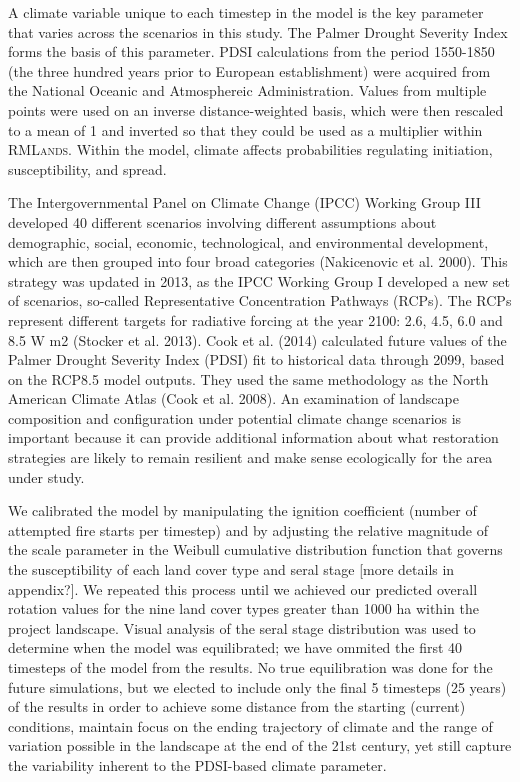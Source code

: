 \documentclass[12pt]{article}
\begin{document}
\begin{spacing}{1}
A climate variable unique to each timestep in the model is the key parameter that varies across the scenarios in this study. The Palmer Drought Severity Index forms the basis of this parameter. PDSI calculations from the period 1550-1850 (the three hundred years prior to European establishment) were acquired from the National Oceanic and Atmosphereic Administration. Values from multiple points were used on an inverse distance-weighted basis, which were then rescaled to a mean of 1 and inverted so that they could be used as a multiplier within \textsc{RMLands}. Within the model, climate affects probabilities regulating initiation, susceptibility, and spread. 

The Intergovernmental Panel on Climate Change (IPCC) Working Group III developed 40 different scenarios involving different assumptions about demographic, social, economic, technological, and environmental development, which are then grouped into four broad categories (Nakicenovic et al. 2000). This strategy was updated in 2013, as the IPCC Working Group I developed a new set of scenarios, so-called Representative Concentration Pathways (RCPs). The RCPs represent different targets for radiative forcing at the year 2100: 2.6, 4.5, 6.0 and 8.5 W m2 (Stocker et al. 2013). Cook et al. (2014) calculated future values of the Palmer Drought Severity Index (PDSI) fit to historical data through 2099, based on the RCP8.5 model outputs. They used the same methodology as the North American Climate Atlas (Cook et al. 2008). An examination of landscape composition and configuration under potential climate change scenarios is important because it can provide additional information about what restoration strategies are likely to remain resilient and make sense ecologically for the area under study. 

We calibrated the model by manipulating the ignition coefficient (number of attempted fire starts per timestep) and by adjusting the relative magnitude of the scale parameter in the Weibull cumulative distribution function that governs the susceptibility of each land cover type and seral stage [more details in appendix?]. We repeated this process until we achieved our predicted overall rotation values for the nine land cover types greater than 1000 ha within the project landscape. Visual analysis of the seral stage distribution was used to determine when the model was equilibrated; we have ommited the first 40 timesteps of the model from the results. No true equilibration was done for the future simulations, but we elected to include only the final 5 timesteps (25 years) of the results in order to achieve some distance from the starting (current) conditions, maintain focus on the ending trajectory of climate and the range of variation possible in the landscape at the end of the 21st century, yet still capture the variability inherent to the PDSI-based climate parameter.


\end{spacing}
\end{document}
